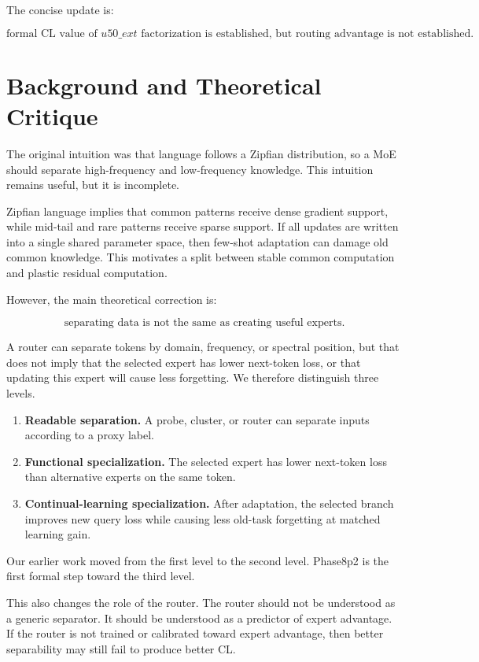 \documentclass[11pt]{article}
\begin{document}
The concise update is:

$$
\text{formal CL value of } u50\_ext \text{ factorization is established, but routing advantage is not established.}
$$

\section{Background and Theoretical Critique}

The original intuition was that language follows a Zipfian distribution, so a MoE should separate high-frequency and low-frequency knowledge. This intuition remains useful, but it is incomplete.

Zipfian language implies that common patterns receive dense gradient support, while mid-tail and rare patterns receive sparse support. If all updates are written into a single shared parameter space, then few-shot adaptation can damage old common knowledge. This motivates a split between stable common computation and plastic residual computation.

However, the main theoretical correction is:

$$
\text{separating data is not the same as creating useful experts.}
$$

A router can separate tokens by domain, frequency, or spectral position, but that does not imply that the selected expert has lower next-token loss, or that updating this expert will cause less forgetting. We therefore distinguish three levels.

\begin{enumerate}[leftmargin=1.5em]
    \item \textbf{Readable separation.} A probe, cluster, or router can separate inputs according to a proxy label.
    \item \textbf{Functional specialization.} The selected expert has lower next-token loss than alternative experts on the same token.
    \item \textbf{Continual-learning specialization.} After adaptation, the selected branch improves new query loss while causing less old-task forgetting at matched learning gain.
\end{enumerate}

Our earlier work moved from the first level to the second level. Phase8p2 is the first formal step toward the third level.

This also changes the role of the router. The router should not be understood as a generic separator. It should be understood as a predictor of expert advantage. If the router is not trained or calibrated toward expert advantage, then better separability may still fail to produce better CL.
\end{document}
